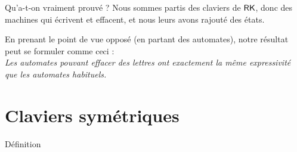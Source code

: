 \documentclass[11pt,french,professionalfonts]{beamer}
\begin{document}
\begin{frame}{Qu'a-t-on vraiment prouvé ?}
	Nous sommes partis des claviers de $\mathsf{RK}$, donc des machines qui écrivent et effacent, et nous leurs avons rajouté des états.
	\pause

    En prenant le point de vue opposé (en partant des automates), notre résultat peut se formuler comme ceci : \\
    \emph{Les automates pouvant effacer des lettres ont exactement la même expressivité que les automates habituels.}
\end{frame}

\section{Claviers symétriques}
\begin{frame}{Définition}
	

\end{frame}
\end{document}
